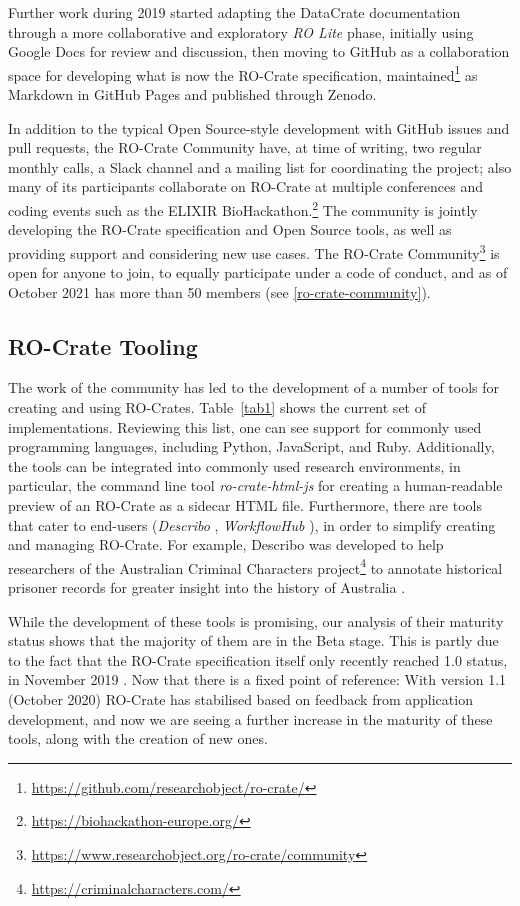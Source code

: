 Further work during 2019 started adapting the DataCrate documentation
through a more collaborative and exploratory \emph{RO Lite} phase,
initially using Google Docs for review and discussion, then moving to
GitHub as a collaboration space for developing what is now the RO-Crate
specification, maintained\footnote{\url{https://github.com/researchobject/ro-crate/}} as
Markdown in GitHub Pages
and published through Zenodo.

In addition to the typical Open Source-style development with GitHub
issues and pull requests, the RO-Crate Community have, at time of
writing, two regular monthly calls, a Slack channel and a mailing list
for coordinating the project; also many of its participants collaborate
on RO-Crate at multiple conferences and coding events such as the
ELIXIR BioHackathon.\footnote{\url{https://biohackathon-europe.org/}} The community
is jointly developing the RO-Crate specification and Open Source tools,
as well as providing support and considering new use cases. The
RO-Crate Community\footnote{\url{https://www.researchobject.org/ro-crate/community}}
is open for anyone to join, to equally participate under a code of
conduct, and as of October 2021 has more than 50 members (see \vref{ro-crate-community}).

\subsection{RO-Crate Tooling}\label{ch5:tooling}

The work of the community has led to the development of a number of
tools for creating and using RO-Crates. Table~\ref{tab1} shows the current set
of implementations. Reviewing this list, one can see support for
commonly used programming languages, including Python, JavaScript, and
Ruby. Additionally, the tools can be integrated into commonly used
research environments, in particular, the command line tool
\textit{ro-crate-html-js} \cite{ch5-95} for creating a human-readable
preview of an RO-Crate as a sidecar HTML file. Furthermore, there are
tools that cater to end-users (\textit{Describo} \cite{ch5-78}, \textit{WorkflowHub}
\cite{ch5-124}), in order to simplify creating and managing
RO-Crate. For example, Describo was developed to help researchers of
the Australian Criminal Characters
project\footnote{\url{https://criminalcharacters.com/}} to annotate historical prisoner
records for greater insight into the history of Australia
\cite{ch5-97}.

While the development of these tools is promising, our analysis of their
maturity status shows that the majority of them are in the Beta stage.
This is partly due to the fact that the RO-Crate specification itself
only recently reached 1.0 status, in November 2019
\cite{ch5-105}. Now that there
is a fixed point of reference: With version 1.1 (October 2020)
\cite{ch5-107} RO-Crate has
stabilised based on feedback from application development, and now we
are seeing a further increase in the maturity of these tools, along with
the creation of new ones.

